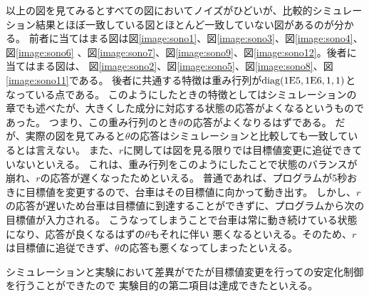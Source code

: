 	以上の図を見てみるとすべての図においてノイズがひどいが、比較的シミュレーション結果とほぼ一致している図とほとんど一致していない図があるのが分かる。
	前者に当てはまる図は図\ref{image:sono1}、図\ref{image:sono3}、図\ref{image:sono4}、図\ref{image:sono6}
	、図\ref{image:sono7}、図\ref{image:sono9}、図\ref{image:sono12}。後者に当てはまる図は、
	図\ref{image:sono2}、図\ref{image:sono5}、図\ref{image:sono8}、図\ref{image:sono11}である。
	後者に共通する特徴は重み行列が$\rm{diag}(1E5,1E6,1,1)$となっている点である。
	このようにしたときの特徴としてはシミュレーションの章でも述べたが、大きくした成分に対応する状態の応答がよくなるというものであった。
	つまり、この重み行列のとき$\theta$の応答がよくなりるはずである。
	だが、実際の図を見てみると$\theta$の応答はシミュレーションと比較しても一致しているとは言えない。
	また、$r$に関しては図を見る限りでは目標値変更に追従できていないといえる。
	これは、重み行列をこのようにしたことで状態のバランスが崩れ、$r$の応答が遅くなったためといえる。
	普通であれば、プログラムが5秒おきに目標値を変更するので、台車はその目標値に向かって動き出す。
	しかし、$r$の応答が遅いため台車は目標値に到達することができずに、プログラムから次の目標値が入力される。
	こうなってしまうことで台車は常に動き続けている状態になり、応答が良くなるはずの$\theta$もそれに伴い
	悪くなるといえる。そのため、$r$は目標値に追従できず、$\theta$の応答も悪くなってしまったといえる。
	\par
	シミュレーションと実験において差異がでたが目標値変更を行っての安定化制御を行うことができたので
	実験目的の第二項目は達成できたといえる。
	
	

\newpage
